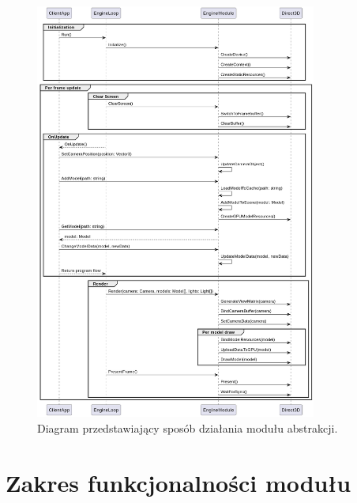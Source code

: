 \begin{figure}[ht!]
	\centering
	\includegraphics[width=350px]{uml/module_type_final.png}
	\caption{Diagram przedstawiający sposób działania modułu abstrakcji.}
	\label{UML_Sequence_Module_Final}
\end{figure}

\section{Zakres funkcjonalności modułu}
